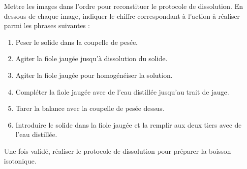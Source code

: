 
\numeroQuestion
Mettre les images dans l'ordre pour reconstituer le protocole de dissolution.
En dessous de chaque image, indiquer le chiffre correspondant à l'action à réaliser parmi les phrases suivantes :
\begin{enumerate}
  \item Peser le solide dans la coupelle de pesée.
  \item Agiter la fiole jaugée jusqu'à dissolution du solide.
  \item Agiter la fiole jaugée pour homogénéiser la solution.
  \item Compléter la fiole jaugée avec de l'eau distillée jusqu’au trait de jauge.
  \item Tarer la balance avec la coupelle de pesée dessus.
  \item Introduire le solide dans la fiole jaugée et la remplir aux deux tiers avec de l'eau distillée.
\end{enumerate}

\begin{boite}
  \vAligne{10cm}
\end{boite}

\numeroQuestion Une fois validé, réaliser le protocole de dissolution pour préparer la boisson isotonique.
